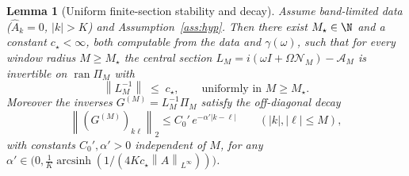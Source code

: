 \documentclass{amsart}
\newtheorem{lemma}{Lemma}
\theoremstyle{definition}
\newcommand{\norm}[1]{\left\lVert#1\right\rVert}
\newcommand{\Acal}{\mathcal{A}}
\newcommand{\Ncal}{\mathcal{N}}
\begin{document}
\begin{lemma}[Uniform finite-section stability and decay]\label{lem:finsec}
Assume band-limited data ($\hat A_k=0$, $|k|>K$) and Assumption~\ref{ass:hyp}.
Then there exist $M_\star\in\N$ and a constant $c_\star<\infty$, both computable
from the data and $\gamma(\omega)$, such that for every window radius $M\ge
M_\star$ the central section $L_M=i(\omega I+\Omega\Ncal_M)-\Acal_M$ is invertible
on $\operatorname{ran}\Pi_M$ with
\begin{equation}\label{eq:unifstab}
\norm{L_M^{-1}}\;\le\; c_\star,\qquad\text{uniformly in }M\ge M_\star .
\end{equation}
Moreover the inverses $G^{(M)}=L_M^{-1}\Pi_M$ satisfy the off-diagonal decay
\begin{equation}\label{eq:decayFS}
\norm{(G^{(M)})_{k\ell}}_2\le C_0'\,e^{-\alpha'|k-\ell|}\qquad(|k|,|\ell|\le M),
\end{equation}
with constants $C_0',\alpha'>0$ \emph{independent of $M$}, for any
$\alpha'\in\big(0,\tfrac1K\operatorname{arcsinh}(1/(4Kc_\star\norm{A}_{L^\infty}))\big)$.
\end{lemma}
\end{document}
